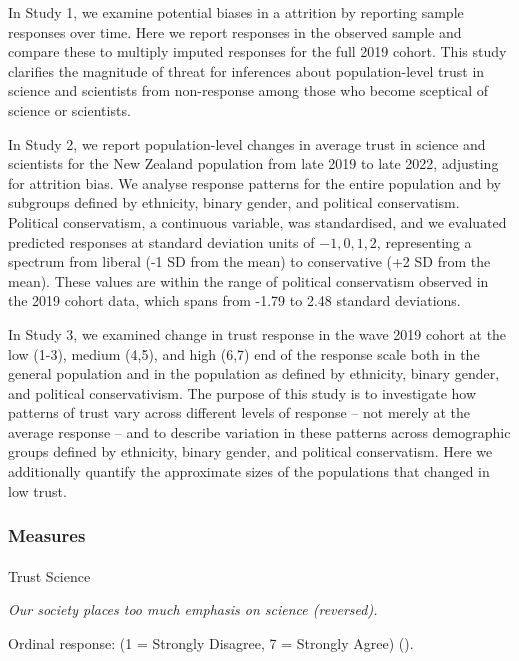 \documentclass[
  single column]{article}
\makeatletter
\let\oldparagraph\paragraph
\renewcommand{\paragraph}{
    \@ifstar
      \xxxParagraphStar
      \xxxParagraphNoStar
  }
\newcommand{\xxxParagraphStar}[1]{\oldparagraph*{#1}\mbox{}}
\newcommand{\xxxParagraphNoStar}[1]{\oldparagraph{#1}\mbox{}}
\makeatother
\begin{document}
In Study 1, we examine potential biases in a attrition by reporting
sample responses over time. Here we report responses in the observed
sample and compare these to multiply imputed responses for the full 2019
cohort. This study clarifies the magnitude of threat for inferences
about population-level trust in science and scientists from non-response
among those who become sceptical of science or scientists.

In Study 2, we report population-level changes in average trust in
science and scientists for the New Zealand population from late 2019 to
late 2022, adjusting for attrition bias. We analyse response patterns
for the entire population and by subgroups defined by ethnicity, binary
gender, and political conservatism. Political conservatism, a continuous
variable, was standardised, and we evaluated predicted responses at
standard deviation units of \({-1, 0, 1, 2}\), representing a spectrum
from liberal (-1 SD from the mean) to conservative (+2 SD from the
mean). These values are within the range of political conservatism
observed in the 2019 cohort data, which spans from -1.79 to 2.48
standard deviations.

In Study 3, we examined change in trust response in the wave 2019 cohort
at the low (1-3), medium (4,5), and high (6,7) end of the response scale
both in the general population and in the population as defined by
ethnicity, binary gender, and political conservativism. The purpose of
this study is to investigate how patterns of trust vary across different
levels of response -- not merely at the average response -- and to
describe variation in these patterns across demographic groups defined
by ethnicity, binary gender, and political conservatism. Here we
additionally quantify the approximate sizes of the populations that
changed in low trust.

\subsubsection{Measures}\label{measures-1}

\paragraph{Trust Science}\label{trust-science-1}

\emph{Our society places too much emphasis on science (reversed).}

Ordinal response: (1 = Strongly Disagree, 7 = Strongly Agree)
().
\end{document}
